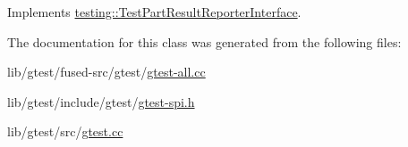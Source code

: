 Implements \hyperlink{classtesting_1_1_test_part_result_reporter_interface_aa2f920e7a5a0a6d0faf19e3727928c22}{testing\-::\-Test\-Part\-Result\-Reporter\-Interface}.



The documentation for this class was generated from the following files\-:\begin{DoxyCompactItemize}
\item 
lib/gtest/fused-\/src/gtest/\hyperlink{fused-src_2gtest_2gtest-all_8cc}{gtest-\/all.\-cc}\item 
lib/gtest/include/gtest/\hyperlink{gtest-spi_8h}{gtest-\/spi.\-h}\item 
lib/gtest/src/\hyperlink{gtest_8cc}{gtest.\-cc}\end{DoxyCompactItemize}

